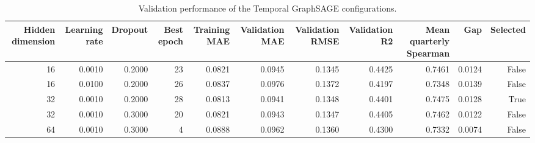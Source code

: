 \begin{table}
\caption{Validation performance of the Temporal GraphSAGE configurations.}
\label{tab:temporal-graphsage-configuration-comparison}
\begin{tabular}{rrrrrrrrrrr}
\toprule
Hidden dimension & Learning rate & Dropout & Best epoch & Training MAE & Validation MAE & Validation RMSE & Validation R2 & Mean quarterly Spearman & Gap & Selected \\
\midrule
16 & 0.0010 & 0.2000 & 23 & 0.0821 & 0.0945 & 0.1345 & 0.4425 & 0.7461 & 0.0124 & False \\
16 & 0.0100 & 0.2000 & 26 & 0.0837 & 0.0976 & 0.1372 & 0.4197 & 0.7348 & 0.0139 & False \\
32 & 0.0010 & 0.2000 & 28 & 0.0813 & 0.0941 & 0.1348 & 0.4401 & 0.7475 & 0.0128 & True \\
32 & 0.0010 & 0.3000 & 20 & 0.0821 & 0.0943 & 0.1347 & 0.4405 & 0.7462 & 0.0122 & False \\
64 & 0.0010 & 0.3000 & 4 & 0.0888 & 0.0962 & 0.1360 & 0.4300 & 0.7332 & 0.0074 & False \\
\bottomrule
\end{tabular}
\end{table}
